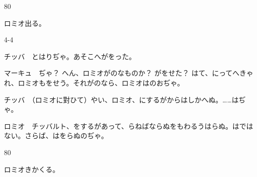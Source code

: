 \documentclass[tate,paper=b6j,jafontsize=9pt]{jlreq}
\begin{document}
\begin{azconvIndented}{8\zw}{0\zw}

ロミオ出る。

\end{azconvIndented}
\begin{azconvIndented}{4\zw}{-4\zw}

チッバ　とはりぢゃ。あそこへがをった。

マーキュ　ぢゃ？ へん、ロミオがのなものか？ がをせた？ はて、にってへきゃれ、ロミオもをせう。それがのなら、ロミオはのおぢゃ。

チッバ　（ロミオに對ひて）やい、ロミオ、にするがからはしかへぬ。……はぢゃ。

ロミオ　チッバルト、をするがあって、らねばならぬをもわるうはらぬ。はではない。さらば、はをらぬのぢゃ。

\end{azconvIndented}
\begin{azconvIndented}{8\zw}{0\zw}

ロミオきかくる。

\end{azconvIndented}
\end{document}
